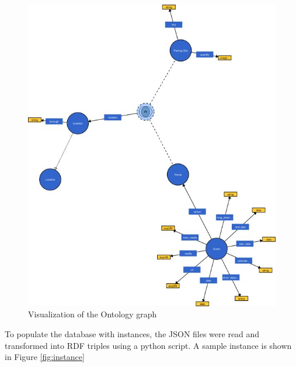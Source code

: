 \documentclass[runningheads,a4paper]{../../StyleFiles/llncs}
\begin{document}
\begin{figure}[h]
	\centering
	\includegraphics[width=1\textwidth]{img/vocab-graph.jpg}
	\caption{Visualization of the Ontology graph}
	\label{fig:vocabulary}
\end{figure}

To populate the database with instances, the JSON files were read and transformed into RDF triples using a python script. A sample instance is shown in Figure \ref{fig:instance}
\end{document}
